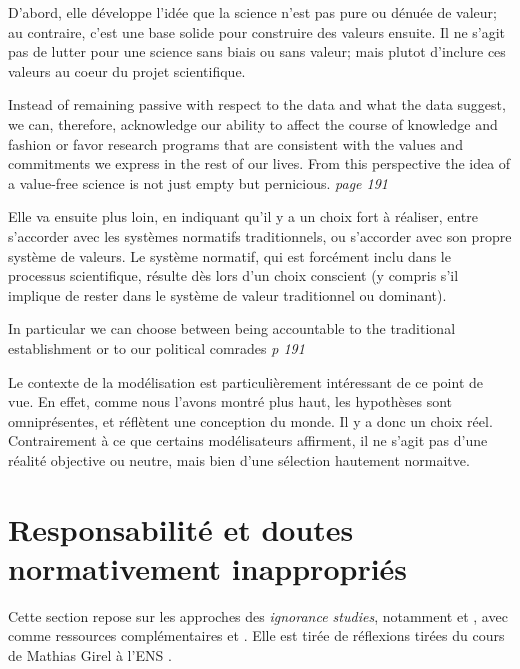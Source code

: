 D'abord, elle développe l'idée que la science n'est pas pure ou dénuée de valeur; au contraire, c'est une base solide pour construire des valeurs ensuite. Il ne s'agit pas de lutter pour une science sans biais ou sans valeur; mais plutot d'inclure ces valeurs au coeur du projet scientifique. 

\begin{authoredquote}
    Instead of remaining passive with respect to the data and what the data suggest, we can, therefore, acknowledge our ability to affect the course of knowledge and fashion or favor research programs that are consistent with the values and commitments we express in the rest of our lives. From this perspective the idea of a value-free science is not just empty but pernicious. \textit{page 191}
\end{authoredquote}

Elle va ensuite plus loin, en indiquant qu'il y a un choix fort à réaliser, entre s'accorder avec les systèmes normatifs traditionnels, ou s'accorder avec son propre système de valeurs. Le système normatif, qui est forcément inclu dans le processus scientifique, résulte dès lors d'un choix conscient (y compris s'il implique de rester dans le système de valeur traditionnel ou dominant). 

\begin{authoredquote}
    In particular we can choose between being accountable to the traditional establishment or to our political comrades \textit{p 191}
\end{authoredquote}

Le contexte de la modélisation est particulièrement intéressant de ce point de vue. En effet, comme nous l'avons montré plus haut, les hypothèses sont omniprésentes, et réflètent une conception du monde. Il y a donc un choix réel. Contrairement à ce que certains modélisateurs affirment, il ne s'agit pas d'une réalité objective ou neutre, mais bien d'une sélection hautement normaitve. \\





\section{Responsabilité et doutes normativement inappropriés}

Cette section repose sur les approches des \textit{ignorance studies}, notamment \cite{melo-martin_fight_2018} et \cite{gross_routledge_2015}, avec comme ressources complémentaires \cite{noauthor_carnet_2024} et \cite{proctor_agnotology_2008}. Elle est tirée de réflexions tirées du cours de Mathias Girel à l'ENS \cite{girel_vertus_2023}. 



